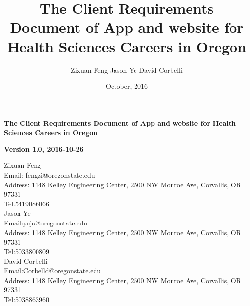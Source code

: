 \documentclass[twoside,letterpaper]{article}
\title {The Client Requirements Document of App and website for Health Sciences Careers in Oregon }
\author{Zixuan Feng
	   Jason Ye
	   David Corbelli }
\date{October, 2016}
\begin{document}
\clearpage\setcounter{page}{1}\pagestyle{Standard}
\thispagestyle{FirstPage}

\bigskip

{\centering{}\bfseries\color{black}
The Client Requirements Document of App and website for Health Sciences Careers in Oregon
\par}


\bigskip

{\centering{}\bfseries\color{black}
Version 1.0, 2016-10-26
\par}


 \vspace{2cm}
\noindent 
Zixuan Feng \\
Email: fengzi@oregonstate.edu\\
Address: 1148 Kelley Engineering Center, 2500 NW Monroe Ave, Corvallis, OR 97331\\
Tel:5419086066\\

 \vspace{1cm}
\noindent 
Jason Ye \\
Email:yeja@oregonstate.edu\\
Address: 1148 Kelley Engineering Center, 2500 NW Monroe Ave, Corvallis, OR 97331\\
Tel:5033800809\\

 \vspace{1cm}
\noindent 
David Corbelli \\
Email:Corbelld@oregonstate.edu\\
Address: 1148 Kelley Engineering Center, 2500 NW Monroe Ave, Corvallis, OR 97331\\
Tel:5038863960\\










\bigskip
\end{document}
